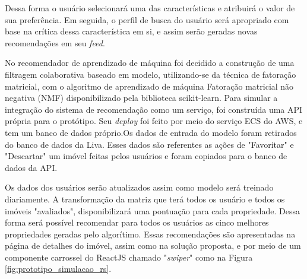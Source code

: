 \begin{apendicesenv}
Dessa forma o usuário selecionará uma das características e atribuirá o valor de sua preferência. Em seguida, o perfil de busca do usuário será apropriado com base na crítica dessa característica em si, e assim serão geradas novas recomendações em seu \textit{feed}.

No recomendador de aprendizado de máquina foi decidido a construção de uma filtragem colaborativa baseado em modelo, utilizando-se da técnica de fatoração matricial, com o algoritmo de aprendizado de máquina Fatoração matricial não negativa (NMF) disponibilizado pela biblioteca scikit-learn. Para simular a integração do sistema de recomendação como um serviço, foi construída uma API própria para o protótipo. Seu \textit{deploy} foi feito por meio do serviço ECS do AWS, e tem um banco de dados próprio.Os dados de entrada do modelo foram retirados do banco de dados da Liva. Esses dados são referentes as ações de "Favoritar" e "Descartar" um imóvel feitas pelos usuários e foram copiados para o banco de dados da API.

Os dados dos usuários serão atualizados assim como modelo será treinado diariamente. A transformação da matriz que terá todos os usuário e todos os imóveis "avaliados", disponibilizará uma pontuação para cada propriedade. Dessa forma será possível recomendar para todos os usuários as cinco melhores propriedades geradas pelo algorítimo. Essas recomendações são apresentadas na página de detalhes do imóvel, assim como na solução proposta, e por meio de um componente carrossel do ReactJS chamado "\textit{swiper}" como na Figura \ref{fig:prototipo_simulacao_rs}.


\end{apendicesenv}
